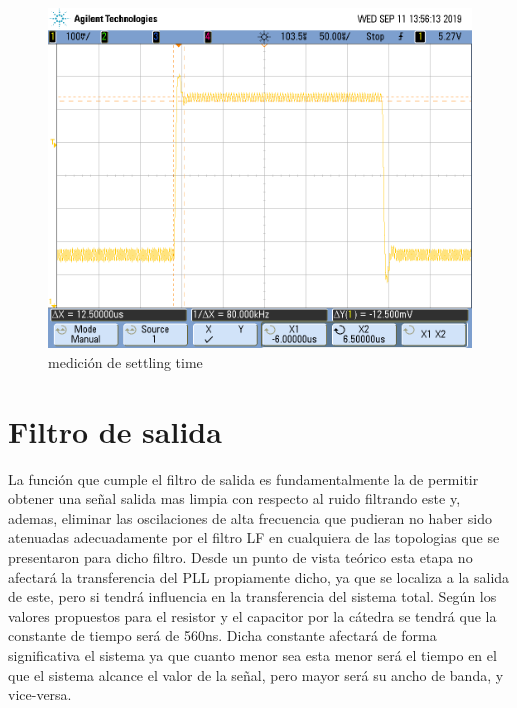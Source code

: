 \documentclass{article}
\begin{document}
\begin{figure}[H]
\centering
\includegraphics[width=0.8\linewidth]{images/05vpp/settling_time.PNG}
\caption{medición de settling time}
\label{fig:settling_time}
\end{figure}


\section*{Filtro de salida}
La función que cumple el filtro de salida es fundamentalmente la de permitir obtener una señal salida mas limpia con respecto al ruido filtrando este y, ademas, eliminar las oscilaciones de alta frecuencia que pudieran no haber sido atenuadas adecuadamente por el filtro LF en cualquiera de las topologias que se presentaron para dicho filtro.
Desde un punto de vista teórico esta etapa no afectará la transferencia del PLL propiamente dicho, ya que se localiza a la salida de este, pero si tendrá influencia en la transferencia del sistema total. Según los valores propuestos para el resistor y el capacitor por la cátedra se tendrá que la constante de tiempo será de 560ns. Dicha constante afectará de forma significativa el sistema ya que cuanto menor sea esta menor será el tiempo en el que el sistema alcance el valor de la señal, pero mayor será su ancho de banda, y vice-versa.


\newpage
\end{document}
